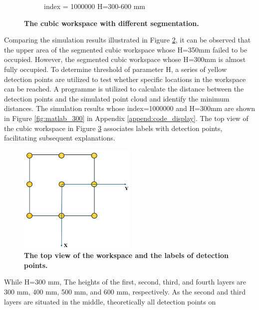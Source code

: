 \begin{figure}[H]
\begin{subfigure}{0.45\textwidth}
        \caption{\centering index = 1000000 H=300-600 mm}
        \label{fig:ws_10000_300}
    \end{subfigure}
    \caption[The cubic workspace with different segmentation]
    {\centering \textbf{The cubic workspace with different segmentation.}}
    \label{fig:ws_300_350}
\end{figure}
\vspace{-5mm}
\noindent Comparing the simulation results illustrated in Figure \ref{fig:ws_300_350}, it can be observed that the upper 
area of the segmented cubic workspace whose H=350mm failed to be occupied. However, the segmented cubic workspace 
whose H=300mm is almost fully occupied. To determine threshold of parameter H, a series of yellow detection points 
are utilized to test whether specific locations in the workspace can be reached. A programme is utilized to calculate 
the distance between the detection points and the simulated point cloud and identify the minimum distances. The  
simulation results whose index=1000000 and H=300mm are shown in Figure \ref{fig:matlab_300} in Appendix 
\ref{append:code_display}. The top view of the cubic workspace in Figure \ref{fig:top_view} associates labels with 
detection points, facilitating subsequent explanations. 
\begin{figure}[H] %
    \centering 
    \captionsetup{labelsep=colon}
    \includegraphics[width=0.5\textwidth]{Image/Result/top_view_rect_workspace.png} 
    \caption[The top view of the workspace and the labels of detection points]
    {\centering \textbf{The top view of the workspace and the labels of detection points.}}
    \label{fig:top_view}
\end{figure}
\vspace{-5mm}
\noindent While H=300 mm, The heights of the first, second, third, and fourth layers are 300 mm, 400 mm, 500 mm, and 600 mm, 
respectively. As the second and third layers are situated in the middle, theoretically all detection points on 
